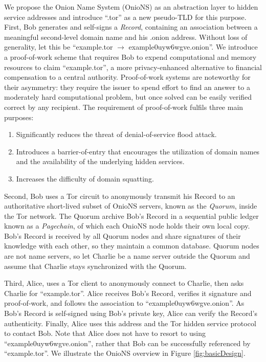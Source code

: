 \documentclass{sig-alternate}
\begin{document}
We propose the Onion Name System (OnioNS) as an abstraction layer to hidden service addresses and introduce ``.tor'' as a new pseudo-TLD for this purpose. First, Bob generates and self-signs a \emph{Record}, containing an association between a meaningful second-level domain name and his .onion address. Without loss of generality, let this be ``example.tor $ \rightarrow $ example0uyw6wgve.onion''. We introduce a proof-of-work scheme that requires Bob to expend computational and memory resources to claim ``example.tor'', a more privacy-enhanced alternative to financial compensation to a central authority. Proof-of-work systems are noteworthy for their asymmetry: they require the issuer to spend effort to find an answer to a moderately hard computational problem, but once solved can be easily verified correct by any recipient. The requirement of proof-of-work fulfils three main purposes:

\begin{enumerate}
	\item Significantly reduces the threat of denial-of-service flood attack.
	\item Introduces a barrier-of-entry that encourages the utilization of domain names and the availability of the underlying hidden services.
	\item Increases the difficulty of domain squatting.
\end{enumerate}

Second, Bob uses a Tor circuit to anonymously transmit his Record to an authoritative short-lived subset of OnioNS servers, known as the \emph{Quorum}, inside the Tor network. The Quorum archive Bob's Record in a sequential public ledger known as a \emph{Pagechain}, of which each OnioNS node holds their own local copy. Bob's Record is received by all Quorum nodes and share signatures of their knowledge with each other, so they maintain a common database. Quorum nodes are not name servers, so let Charlie be a name server outside the Quorum and assume that Charlie stays synchronized with the Quorum.

Third, Alice, uses a Tor client to anonymously connect to Charlie, then asks Charlie for ``example.tor''. Alice receives Bob's Record, verifies it signature and proof-of-work, and follows the association to ``example0uyw6wgve.onion''. As Bob's Record is self-signed using Bob's private key, Alice can verify the Record's authenticity. Finally, Alice uses this address and the Tor hidden service protocol to contact Bob. Note that Alice does not have to resort to using ``example0uyw6wgve.onion'', rather that Bob can be successfully referenced by ``example.tor''. We illustrate the OnioNS overview in Figure \ref{fig:basicDesign}.
\end{document}
